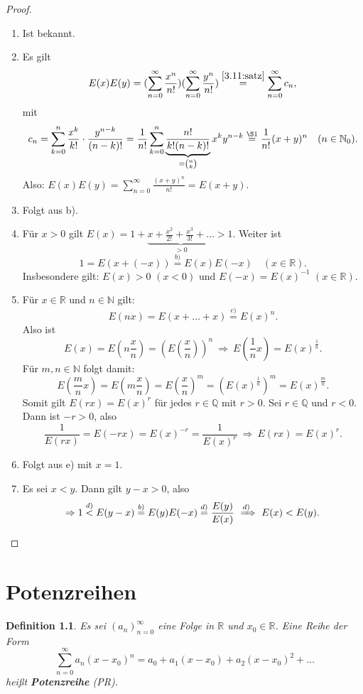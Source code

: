 \documentclass[12pt]{extreport} %
\newcommand{\N}{\mathbb{N}}
\newcommand{\Q}{\mathbb{Q}}
\newcommand{\R}{\mathbb{R}}
\theoremstyle{named}
\theoremstyle{itshape}
\newtheorem*{definition}{Definition}
\theoremstyle{normal}
\begin{document}
\begin{proof} ~\
	\begin{enumerate}
		\item Ist bekannt.
		\item Es gilt
		        $$ E(x)E(y) = (\sum_{n=0}^{\infty} \frac{x^{n}}{n!})(\sum_{n=0}^{\infty} \frac{y^{n}}{n!}) \overset{\ref{3.11:satz}}{=} \sum_{n=0}^{\infty} c_{n},$$
		        mit
			$$ c_{n} = \sum_{k=0}^{n} \frac{x^{k}}{k!} \cdot \frac{y^{n-k}}{(n-k)!} 
			= \frac{1}{n!} \sum_{k=0}^{n} \underbrace{\frac{n!}{k! (n-k)!}}_{=\binom{n}{k}} x^{k} y^{n-k} \overset{\S1}{=} \frac{1}{n!} (x+y)^{n} \quad (n \in \N_0).$$
			Also: $E(x)E(y) = \sum_{n=0}^{\infty} \frac{(x+y)^{n}}{n!} = E(x+y)$.
		\item Folgt aus b).
		\item Für $x > 0$ gilt $E(x) = 1 + \underbrace{x + \frac{x^{2}}{2!} + \frac{x^{3}}{3!} + \dotsc}_{> 0} > 1$. Weiter ist
			$$ 1 = E\left(x + (-x)\right) \overset{b)}{=} E(x) E(-x)  \quad (x \in \R). $$
			Insbesondere gilt: $E(x) > 0$ $(x < 0)$ und $E(-x) = E(x)^{-1}$ $(x \in \R)$.
		\item   Für $x \in \R$ und $n \in \N$ gilt:
			$$ E(nx) = E(x + \dotsc + x) \overset{c)}{=} E(x)^{n}. $$
			Also ist
			$$E(x) = E (n \frac{x}{n}) = (E(\frac{x}{n}))^{n} ~ \Rightarrow ~ E(\frac{1}{n} x) = E(x)^{\frac{1}{n}}.$$
			Für $m, n \in \N$ folgt damit:
			$$ E(\frac{m}{n} x) = E(m \frac{x}{n}) = E(\frac{x}{n})^{m} = (E(x)^{\frac{1}{n}})^{m} = E(x)^{\frac{m}{n}}. $$
			Somit gilt $E(rx) = E(x)^{r}$ für jedes $r \in \Q$ mit $r > 0$. Sei $r \in \Q$ und $r < 0$. Dann ist $-r > 0$, also
			$$ \frac{1}{E(rx)} = E(-rx)=E(x)^{-r} = \frac{1}{E(x)^{r}} ~ \Rightarrow ~ E(rx) = E(x)^{r}.$$
		\item Folgt aus e) mit $x = 1$.
		\item Es sei $x < y$. Dann gilt $y - x > 0$, also 
			$$ \Rightarrow 1 \overset{d)}{<} E(y - x) \overset{b)}{=} E(y)E(-x) \overset{d)}{=} \frac{E(y)}{E(x)} ~ \xRightarrow[]{d)} ~ E(x) < E(y). $$
	\end{enumerate}
\end{proof}


\newpage


\chapter{Potenzreihen}

\begin{definition}
	Es sei $(a_{n})_{n=0}^{\infty}$ eine Folge in $\R$ und $x_{0} \in \R$. Eine Reihe der Form
		$$ \sum_{n=0}^{\infty} a_{n} (x - x_{0})^{n} = a_{0} + a_{1} (x - x_{0}) + a_{2} (x - x_{0})^{2} + \dotsc $$
		hei{\ss}t \textbf{Potenzreihe} (PR). 
\end{definition}
\end{document}
